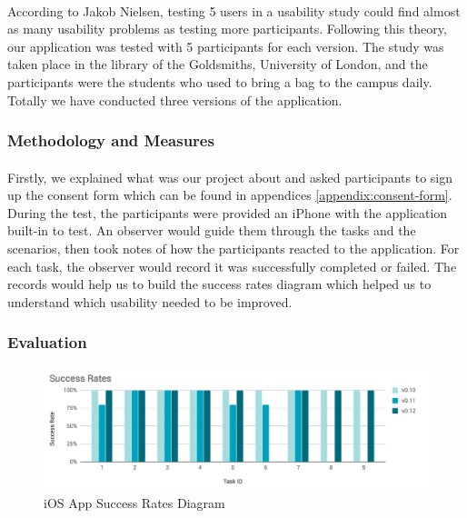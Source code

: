 \documentclass[12pt,a4paper]{article}
\begin{document}
          \paragraph{} According to Jakob Nielsen, testing 5 users in a usability study could find almost as many usability problems as testing more participants\cite{HowManyTestUsers}. Following this theory, our application was tested with 5 participants for each version. The study was taken place in the library of the Goldsmiths, University of London, and the participants were the students who used to bring a bag to the campus daily. Totally we have conducted three versions of the application.
          
        \subsubsection{Methodology and Measures}
          \paragraph{} Firstly, we explained what was our project about and asked participants to sign up the consent form which can be found in appendices \ref{appendix:consent-form}. During the test, the participants were provided an iPhone with the application built-in to test. An observer would guide them through the tasks and the scenarios, then took notes of how the participants reacted to the application. For each task, the observer would record it was successfully completed or failed. The records would help us to build the success rates diagram which helped us to understand which usability needed to be improved\cite{SuccessRates}. 
        
        \subsubsection{Evaluation}
          
          \begin{figure}[H]
            \centering
            \includegraphics[width=1\textwidth]{../assets/usability-test-success-rates.png}
            \caption{iOS App Success Rates Diagram}
            \label{fig:iOS App Success Rates Diagram}
          \end{figure}
\end{document}
